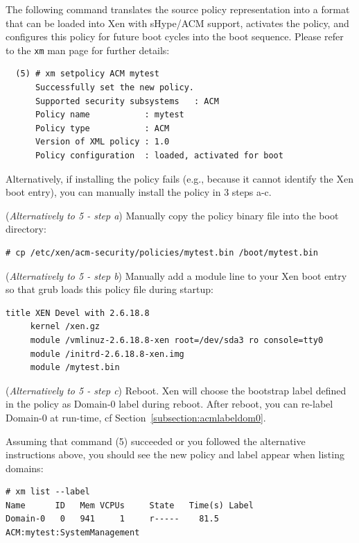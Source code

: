 \documentclass[11pt,twoside,final,openright]{report}
\begin{document}
The following command translates the source policy representation
into a format that can be loaded into Xen with sHype/ACM support,
activates the policy, and configures this policy for future boot
cycles into the boot sequence. Please refer to the \verb|xm|
man page for further details:

\begin{verbatim}
  (5) # xm setpolicy ACM mytest
      Successfully set the new policy.
      Supported security subsystems   : ACM
      Policy name           : mytest
      Policy type           : ACM
      Version of XML policy : 1.0
      Policy configuration  : loaded, activated for boot
\end{verbatim}

Alternatively, if installing the policy fails (e.g., because it cannot
identify the Xen boot entry), you can manually install the policy in 3
steps a-c.

(\textit{Alternatively to 5 - step a}) Manually copy the policy binary
file into the boot directory:

\begin{scriptsize}
\begin{verbatim}
# cp /etc/xen/acm-security/policies/mytest.bin /boot/mytest.bin
\end{verbatim}
\end{scriptsize}

(\textit{Alternatively to 5 - step b}) Manually add a module line to your
Xen boot entry so that grub loads this policy file during startup:

\begin{scriptsize}
\begin{verbatim}
title XEN Devel with 2.6.18.8
     kernel /xen.gz
     module /vmlinuz-2.6.18.8-xen root=/dev/sda3 ro console=tty0
     module /initrd-2.6.18.8-xen.img
     module /mytest.bin
\end{verbatim}
\end{scriptsize}

(\textit{Alternatively to 5 - step c}) Reboot. Xen will choose the
bootstrap label defined in the policy as Domain-0 label during reboot.
After reboot, you can re-label Domain-0 at run-time,
cf Section~\ref{subsection:acmlabeldom0}.

Assuming that command (5) succeeded or you followed the alternative
instructions above, you should see the new policy and label appear
when listing domains:

\begin{scriptsize}
\begin{verbatim}
# xm list --label
Name      ID   Mem VCPUs     State   Time(s) Label
Domain-0   0   941     1     r-----    81.5  ACM:mytest:SystemManagement
\end{verbatim}
\end{scriptsize}
\end{document}

